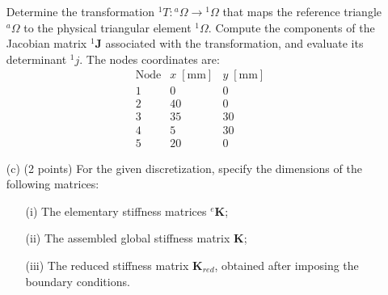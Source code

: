 \documentclass[12pt]{article}
\begin{document}
\begin{itemize}
\begin{center}
	      \end{center}
	      Determine the transformation ${}^1T : {}^a\Omega \to {}^1\Omega$ that maps the reference triangle ${}^a\Omega$ to the physical triangular element ${}^1\Omega$. Compute the components of the Jacobian matrix ${}^1\mathbf{J}$ associated with the transformation, and evaluate its determinant ${}^1{j}$. The nodes coordinates are:
	      \[
		      \begin{array}{c|cc}
			      \text{Node} & x\;[\text{mm}] & y\;[\text{mm}] \\\hline
			      1           & 0              & 0              \\
			      2           & 40             & 0              \\
			      3           & 35             & 30             \\
			      4           & 5              & 30             \\
			      5           & 20             & 0
		      \end{array}
	      \]

	\item[(c)] (2 points) For the given discretization, specify the dimensions of the following matrices:

	      \begin{itemize}
		      \item[(i)] The elementary stiffness matrices ${}^e \mathbf{K}$;
		      \item[(ii)] The assembled global stiffness matrix $\mathbf{K}$;
		      \item[(iii)]  The reduced stiffness matrix $\mathbf{K}_{red}$, obtained after imposing the boundary conditions.
	      \end{itemize}


\end{itemize}
\end{document}
